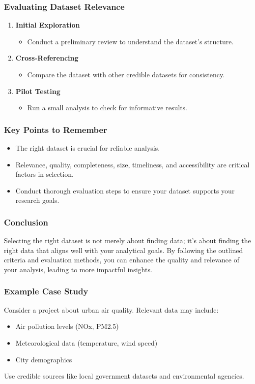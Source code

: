 \documentclass[aspectratio=169]{beamer}
\begin{document}
\begin{frame}[fragile]
    \frametitle{Evaluating Dataset Relevance}
    \begin{enumerate}
        \item \textbf{Initial Exploration}
        \begin{itemize}
            \item Conduct a preliminary review to understand the dataset’s structure.
        \end{itemize}

        \item \textbf{Cross-Referencing}
        \begin{itemize}
            \item Compare the dataset with other credible datasets for consistency.
        \end{itemize}

        \item \textbf{Pilot Testing}
        \begin{itemize}
            \item Run a small analysis to check for informative results.
        \end{itemize}
    \end{enumerate}
\end{frame}

\begin{frame}[fragile]
    \frametitle{Key Points to Remember}
    \begin{itemize}
        \item The right dataset is crucial for reliable analysis.
        \item Relevance, quality, completeness, size, timeliness, and accessibility are critical factors in selection.
        \item Conduct thorough evaluation steps to ensure your dataset supports your research goals.
    \end{itemize}
\end{frame}

\begin{frame}[fragile]
    \frametitle{Conclusion}
    Selecting the right dataset is not merely about finding data; it’s about finding the right data that aligns well with your analytical goals. By following the outlined criteria and evaluation methods, you can enhance the quality and relevance of your analysis, leading to more impactful insights.
\end{frame}

\begin{frame}[fragile]
    \frametitle{Example Case Study}
    Consider a project about urban air quality. Relevant data may include:
    \begin{itemize}
        \item Air pollution levels (NOx, PM2.5)
        \item Meteorological data (temperature, wind speed)
        \item City demographics
    \end{itemize}
    
    Use credible sources like local government datasets and environmental agencies.
\end{frame}
\end{document}
